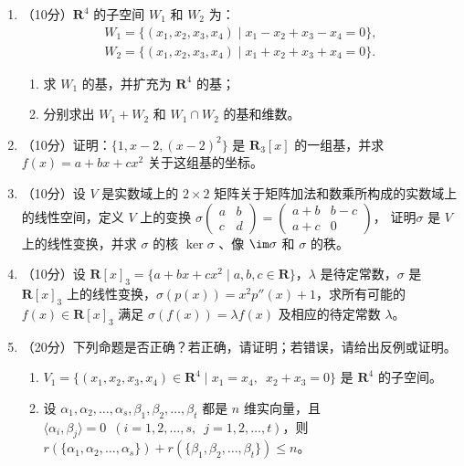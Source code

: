 \begin{enumerate}
    \item （10分）\(\mathbf{R}^4\) 的子空间 \(W_1\) 和 \(W_2\) 为：
    \begin{align*}
        W_1 = \{ (x_1,x_2,x_3,x_4) \mid x_1 - x_2 + x_3 - x_4 = 0 \}, \\
        W_2 = \{ (x_1,x_2,x_3,x_4) \mid x_1 + x_2 + x_3 + x_4 = 0 \}.
    \end{align*}
    \begin{enumerate}
        \item 求 \(W_1\) 的基，并扩充为 \(\mathbf{R}^4\) 的基；

        \item 分别求出 \(W_1+W_2\) 和 \(W_1\cap W_2\) 的基和维数。
    \end{enumerate}

    \item （10分）证明：\(\{1,x-2,(x-2)^2\}\) 是 \(\mathbf{R}_3[x]\) 的一组基，并求 \(f(x)=a+bx+cx^2\) 关于这组基的坐标。

    \item （10分）设 \(V\) 是实数域上的 \(2\times2\) 矩阵关于矩阵加法和数乘所构成的实数域上的线性空间，定义 \(V\) 上的变换
    \(\sigma\left(\begin{matrix}
        a & b \\
        c & d
    \end{matrix}\right)= \begin{pmatrix}
        a + b & b - c \\
        a + c & 0
    \end{pmatrix}
    \)，
    证明\(\sigma\) 是 \(V\) 上的线性变换，并求 \(\sigma\) 的核 \(\ker \sigma\) 、像 \(\im \sigma\) 和 \(\sigma\) 的秩。

    \item （10分）设 $\mathbf{R}[x]_3 = \{a + bx + cx^2 \mid a, b, c \in \mathbf{R}\}$，$\lambda$ 是待定常数，$\sigma$ 是 $\mathbf{R}[x]_3$ 上的线性变换，$\sigma(p(x)) = x^2 p''(x) + 1$，求所有可能的 $f(x) \in \mathbf{R}[x]_3$ 满足 $\sigma(f(x)) = \lambda f(x)$ 及相应的待定常数 $\lambda$。

    \item （20分）下列命题是否正确？若正确，请证明；若错误，请给出反例或证明。
    \begin{enumerate}
        \item \(V_1 = \{(x_1,x_2,x_3,x_4)\in \mathbf{R}^4 \mid x_1 = x_4,\enspace x_2 + x_3 = 0\}\) 是 \(\mathbf{R}^4\) 的子空间。

        \item 设 \(\alpha_1,\alpha_2,\ldots,\alpha_s,\beta_1,\beta_2,\ldots,\beta_t\) 都是 \(n\) 维实向量，且 \(\langle \alpha_i,\beta_j \rangle=0\enspace\allowbreak (i=1,2,\ldots,s,\enspace\allowbreak j=1,2,\ldots,t)\)，则 \(r(\{\alpha_1,\alpha_2,\ldots,\alpha_s\})+r(\{\beta_1,\beta_2,\ldots,\beta_t\}) \leqslant n\)。


\end{enumerate}
\end{enumerate}
